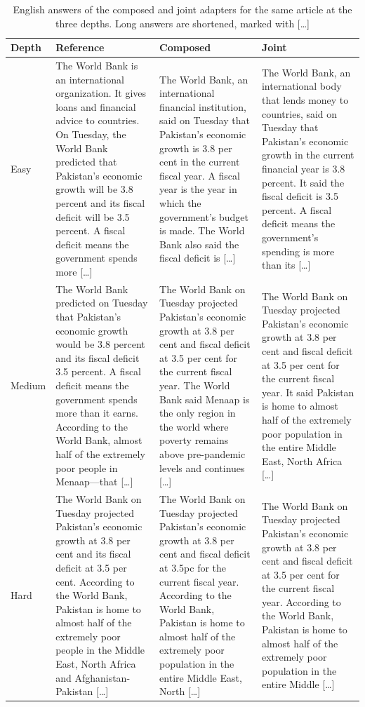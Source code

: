 \documentclass{FastFyp}
\begin{document}
\begin{table}[H]
\centering
\caption{English answers of the composed and joint adapters for the same article at the three depths. Long answers are shortened, marked with [\dots]}
\label{tab:comp-out-en}
\footnotesize
\begin{tabular}{|p{}|p{}|p{}|p{}|}
\hline
\textbf{Depth} & \textbf{Reference} & \textbf{Composed} & \textbf{Joint} \\ \hline
Easy & The World Bank is an international organization. It gives loans and financial advice to countries. On Tuesday, the World Bank predicted that Pakistan's economic growth will be 3.8 percent and its fiscal deficit will be 3.5 percent. A fiscal deficit means the government spends more [\dots] & The World Bank, an international financial institution, said on Tuesday that Pakistan's economic growth is 3.8 per cent in the current fiscal year. A fiscal year is the year in which the government's budget is made. The World Bank also said the fiscal deficit is [\dots] & The World Bank, an international body that lends money to countries, said on Tuesday that Pakistan's economic growth in the current financial year is 3.8 percent. It said the fiscal deficit is 3.5 percent. A fiscal deficit means the government's spending is more than its [\dots] \\ \hline
Medium & The World Bank predicted on Tuesday that Pakistan's economic growth would be 3.8 percent and its fiscal deficit 3.5 percent. A fiscal deficit means the government spends more than it earns. According to the World Bank, almost half of the extremely poor people in Menaap—that [\dots] & The World Bank on Tuesday projected Pakistan's economic growth at 3.8 per cent and fiscal deficit at 3.5 per cent for the current fiscal year. The World Bank said Menaap is the only region in the world where poverty remains above pre-pandemic levels and continues [\dots] & The World Bank on Tuesday projected Pakistan's economic growth at 3.8 per cent and fiscal deficit at 3.5 per cent for the current fiscal year. It said Pakistan is home to almost half of the extremely poor population in the entire Middle East, North Africa [\dots] \\ \hline
Hard & The World Bank on Tuesday projected Pakistan's economic growth at 3.8 per cent and its fiscal deficit at 3.5 per cent. According to the World Bank, Pakistan is home to almost half of the extremely poor people in the Middle East, North Africa and Afghanistan-Pakistan [\dots] & The World Bank on Tuesday projected Pakistan's economic growth at 3.8 per cent and fiscal deficit at 3.5pc for the current fiscal year. According to the World Bank, Pakistan is home to almost half of the extremely poor population in the entire Middle East, North [\dots] & The World Bank on Tuesday projected Pakistan's economic growth at 3.8 per cent and fiscal deficit at 3.5 per cent for the current fiscal year. According to the World Bank, Pakistan is home to almost half of the extremely poor population in the entire Middle [\dots] \\ \hline
\end{tabular}
\end{table}
\end{document}
